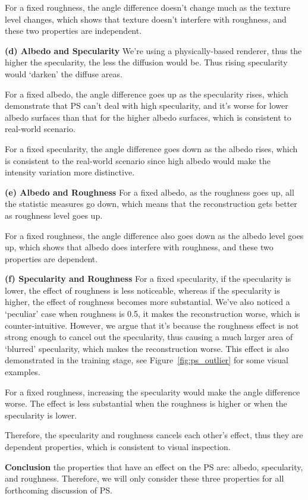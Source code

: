 For a fixed roughness, the angle difference doesn't change much as the texture level changes, which shows that texture doesn't interfere with roughness, and these two properties are independent.

\textbf{(d) Albedo and Specularity} 
We're using a physically-based renderer, thus the higher the specularity, the less the diffusion would be. Thus rising specularity would `darken' the diffuse areas.

For a fixed albedo, the angle difference goes up as the specularity rises, which demonstrate that PS can't deal with high specularity, and it's worse for lower albedo surfaces than that for the higher albedo surfaces, which is consistent to real-world scenario.

For a fixed specularity, the angle difference goes down as the albedo rises, which is consistent to the real-world scenario since high albedo would make the intensity variation more distinctive.

\textbf{(e) Albedo and Roughness} 
For a fixed albedo, as the roughness goes up, all the statistic measures go down, which means that the reconstruction gets better as roughness level goes up.

For a fixed roughness, the angle difference also goes down as the albedo level goes up, which shows that albedo does interfere with roughness, and these two properties are dependent.

\textbf{(f) Specularity and Roughness}
For a fixed specularity, if the specularity is lower, the effect of roughness is less noticeable, whereas if the specularity is higher, the effect of roughness becomes more substantial. We've also noticed a `peculiar' case when roughness is 0.5, it makes the reconstruction worse, which is counter-intuitive. However, we argue that it's because the roughness effect is not strong enough to cancel out the specularity, thus causing a much larger area of `blurred' specularity, which makes the reconstruction worse. This effect is also demonstrated in the training stage, see Figure~\ref{fig:ps_outlier} for some visual examples.

For a fixed roughness, increasing the specularity would make the angle difference worse. The effect is less substantial when the roughness is higher or when the specularity is lower.

Therefore, the specularity and roughness cancels each other's effect, thus they are dependent properties, which is consistent to visual inspection.

\textbf{Conclusion} the properties that have an effect on the PS are: albedo, specularity, and roughness. Therefore, we will only consider these three properties for all forthcoming discussion of PS.

